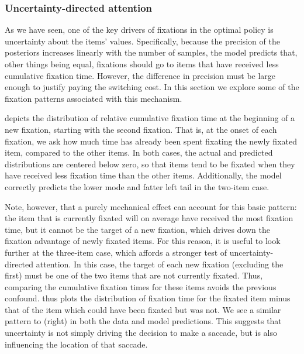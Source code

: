 \subsubsection{Uncertainty-directed attention}

As we have seen, one of the key drivers of fixations in the optimal policy is uncertainty about the items' values. Specifically, because the precision of the posteriors increases linearly with the number of samples, the model predicts that, other things being equal, fixations should go to items that have received less cumulative fixation time. However, the difference in precision must be large enough to justify paying the switching cost. In this section we explore some of the fixation patterns associated with this mechanism.

 depicts the distribution of relative cumulative fixation time at the beginning of a new fixation, starting with the second fixation. That is, at the onset of each fixation, we ask how much time has already been spent fixating the newly fixated item, compared to the other items. In both cases, the actual and predicted distributions are centered below zero, so that items tend to be fixated when they have received less fixation time than the other items. Additionally, the model correctly predicts the lower mode and fatter left tail in the two-item case.

Note, however, that a purely mechanical effect can account for this basic pattern: the item that is currently fixated will on average have received the most fixation time, but it cannot be the target of a new fixation, which drives down the fixation advantage of newly fixated items. For this reason, it is useful to look further at the three-item case, which affords a stronger test of uncertainty-directed attention. In this case, the target of each new fixation (excluding the first) must be one of the two items that are not currently fixated. Thus, comparing the cumulative fixation times for these items avoids the previous confound.  thus plots the distribution of fixation time for the fixated item minus that of the item which could have been fixated but was not. We see a similar pattern to  (right) in both the data and model predictions. This suggests that uncertainty is not simply driving the decision to make a saccade, but is also influencing the location of that saccade.

